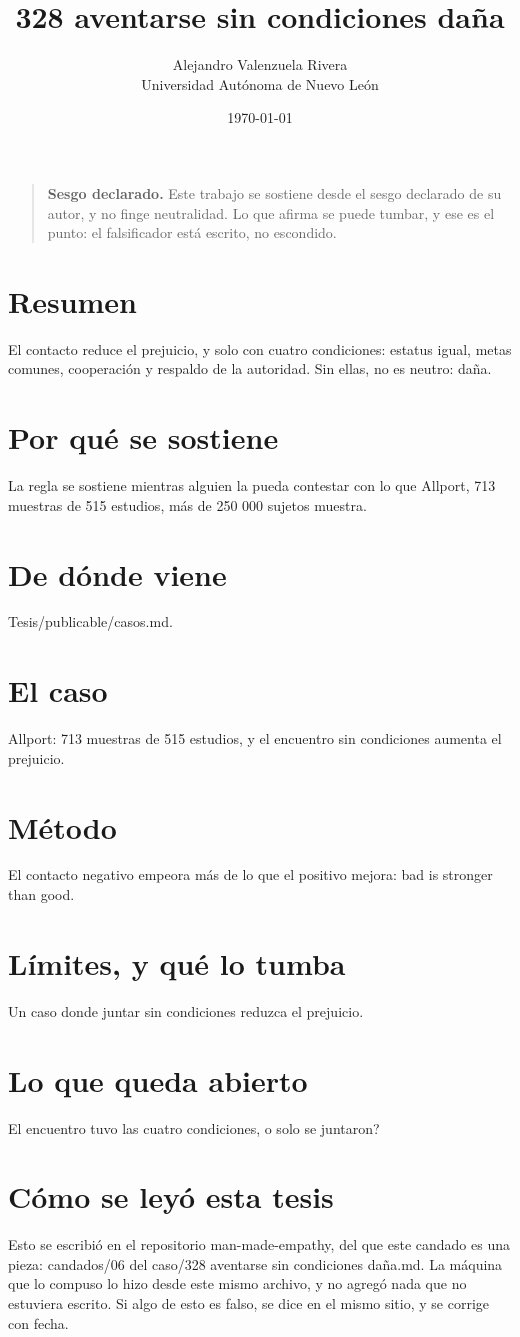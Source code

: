 \documentclass[11pt,a4paper]{article}
\title{328 aventarse sin condiciones daña}
\author{Alejandro Valenzuela Rivera\\\small Universidad Autónoma de Nuevo León}
\date{\today}
\begin{document}
\maketitle

\begin{quote}
\textbf{Sesgo declarado.} Este trabajo se sostiene desde el sesgo declarado de su autor, y no finge neutralidad. Lo que afirma se puede tumbar, y ese es el punto: el falsificador está escrito, no escondido.
\end{quote}

\section*{Resumen}
El contacto reduce el prejuicio, y solo con cuatro condiciones: estatus igual, metas comunes, cooperación y respaldo de la autoridad. Sin ellas, no es neutro: daña.

\section{Por qué se sostiene}
La regla se sostiene mientras alguien la pueda contestar con lo que Allport, 713 muestras de 515 estudios, más de 250 000 sujetos muestra.

\section{De dónde viene}
Tesis/publicable/casos.md.

\section{El caso}
Allport: 713 muestras de 515 estudios, y el encuentro sin condiciones aumenta el prejuicio.

\section{Método}
El contacto negativo empeora más de lo que el positivo mejora: bad is stronger than good.

\section{Límites, y qué lo tumba}
Un caso donde juntar sin condiciones reduzca el prejuicio.

\section{Lo que queda abierto}
\textquestiondown{}El encuentro tuvo las cuatro condiciones, o solo se juntaron?

\section*{Cómo se leyó esta tesis}
Esto se escribió en el repositorio man-made-empathy, del que este candado es una pieza: candados/06 del caso/328 aventarse sin condiciones daña.md. La máquina que lo compuso lo hizo desde este mismo archivo, y no agregó nada que no estuviera escrito. Si algo de esto es falso, se dice en el mismo sitio, y se corrige con fecha.
\end{document}
